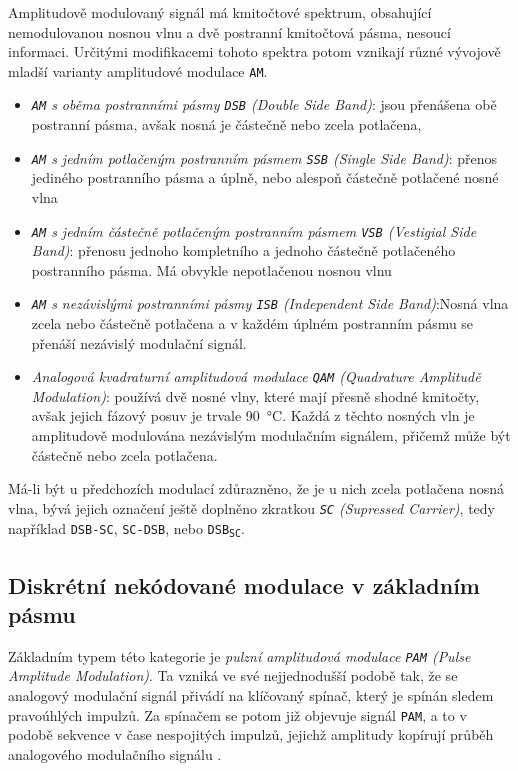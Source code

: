       Amplitudově modulovaný signál má kmitočtové spektrum, obsahující nemodulovanou nosnou vlnu a 
      dvě postranní kmitočtová pásma, nesoucí informaci. Určitými modifikacemi tohoto spektra potom 
      vznikají různé vývojově mladší varianty amplitudové modulace \texttt{AM}. 
      \begin{itemize}
        \item \emph{\texttt{AM} s oběma postranními pásmy \texttt{DSB} (Double Side Band)}: jsou 
               přenášena obě postranní pásma, avšak nosná je částečně nebo zcela potlačena,
        \item \emph{\texttt{AM} s jedním potlačeným postranním pásmem \texttt{SSB} (Single Side 
               Band)}: přenos jediného postranního pásma a úplně, nebo alespoň částečně potlačené 
               nosné vlna
        \item \emph{\texttt{AM} s jedním částečně potlačeným postranním pásmem \texttt{VSB} 
               (Vestigial Side Band)}: přenosu jednoho kompletního a jednoho částečně potlačeného 
               postranního pásma. Má obvykle nepotlačenou nosnou vlnu 
        \item \emph{\texttt{AM} s nezávislými postranními pásmy \texttt{ISB} (Independent Side 
               Band)}:Nosná vlna zcela nebo částečně potlačena a v každém úplném postranním pásmu 
               se přenáší nezávislý modulační signál.
        \item \emph{Analogová kvadraturní amplitudová modulace \texttt{QAM} (Quadrature Amplitudě 
               Modulation)}: používá dvě nosné vlny, které mají přesně shodné kmitočty, avšak 
               jejich fázový posuv je trvale \SI{90}{\degreeCelsius}. Každá z těchto nosných vln je 
               amplitudově modulována nezávislým modulačním signálem, přičemž může být částečně 
               nebo zcela potlačena.
      \end{itemize}
      
      Má-li být u předchozích modulací zdůrazněno, že je u nich zcela potlačena nosná vlna, bývá 
      jejich označení ještě doplněno zkratkou \emph{\texttt{SC} (Supressed Carrier)}, tedy 
      například \texttt{DSB-SC}, \texttt{SC-DSB}, nebo \texttt{DSB\textsubscript{SC}}.
      
    \subsection{Diskrétní nekódované modulace v základním pásmu}
      Základním typem této kategorie je \emph{pulzní amplitudová modulace \texttt{PAM} (Pulse 
      Amplitude Modulation)}. Ta vzniká ve své nejjednodušší podobě tak, že se analogový modulační 
      signál přivádí na klíčovaný spínač, který je spínán sledem pravoúhlých impulzů. Za spínačem 
      se potom již objevuje signál \texttt{PAM}, a to v podobě sekvence v čase nespojitých impulzů, 
      jejichž amplitudy kopírují průběh analogového modulačního signálu \cite[s.~84]{ZaludRA}.
      

